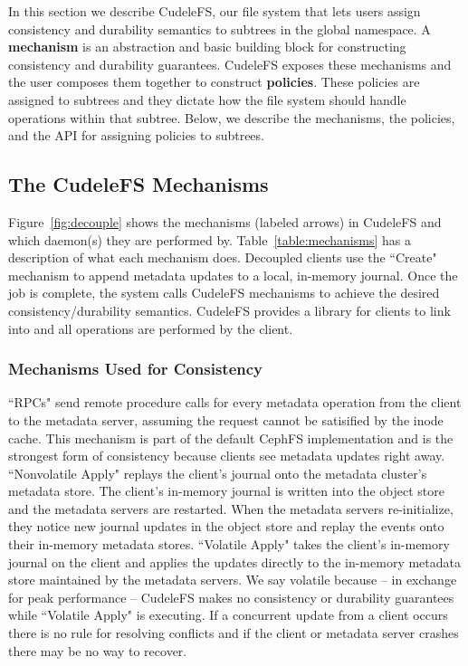 In this section we describe CudeleFS, our file system that lets users
assign consistency and durability semantics to subtrees in the global
namespace. A \textbf{mechanism} is an abstraction and basic building block for
constructing consistency and durability guarantees. CudeleFS exposes these
mechanisms and the user composes them together to construct
\textbf{policies}. These policies are assigned to subtrees and they dictate how
the file system should handle operations within that subtree.  Below, we
describe the mechanisms, the policies, and the API for assigning policies to
subtrees.

\subsection{The CudeleFS Mechanisms}
\label{sec:the-cudelesfs-mechanisms}

Figure~\ref{fig:decouple} shows the mechanisms (labeled arrows) in CudeleFS and
which daemon(s) they are performed by.  Table~\ref{table:mechanisms} has a
description of what each mechanism does.  Decoupled clients use the ``Create"
mechanism to append metadata updates to a local, in-memory journal. Once the
job is complete, the system calls CudeleFS mechanisms to achieve the desired
consistency/durability semantics.  CudeleFS provides a library for clients to
link into and all operations are performed by the client.  

\subsubsection{Mechanisms Used for Consistency} ``RPCs" send remote procedure
calls for every metadata operation from the client to the metadata server,
assuming the request cannot be satisified by the inode cache. This mechanism is
part of the default CephFS implementation and is the strongest form of
consistency because clients see metadata updates right away.  ``Nonvolatile
Apply" replays the client's journal onto the metadata cluster's metadata store.
The client's in-memory journal is written into the object store and the
metadata servers are restarted. When the metadata servers re-initialize, they
notice new journal updates in the object store and replay the events onto their
in-memory metadata stores.  ``Volatile Apply" takes the client's in-memory journal on the
client and applies the updates directly to the in-memory metadata store maintained
by the metadata servers. We say volatile because -- in exchange for peak
performance -- CudeleFS makes no consistency or durability guarantees while
``Volatile Apply" is executing.  If a concurrent update from a client occurs
there is no rule for resolving conflicts and if the client or metadata server
crashes there may be no way to recover.

